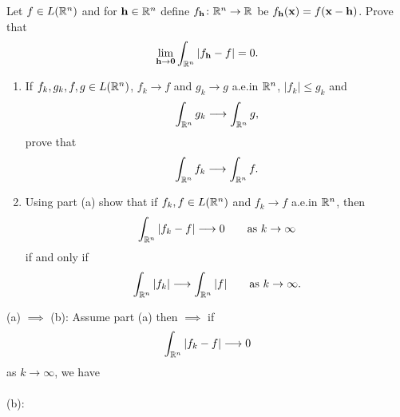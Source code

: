 \begin{problem}
Let $f\in L(\mathbb{R}^n)$ and for $\mathbf{h}\in\mathbb{R}^n$ define
$f_{\mathbf{h}}\colon\mathbb{R}^n\to\mathbb{R}$ be $f_{\mathbf{h}}(\mathbf{x})=
f(\mathbf{x}-\mathbf{h})$. Prove that
\[
\lim_{\mathbf{h}\to\mathbf{0}}\int_{\mathbb{R}^n}\left|f_{\mathbf{h}}-f\right|=0.
\]
\end{problem}
\begin{solution}
\end{solution}

\begin{problem}
\begin{enumerate}[label=(\alph*),noitemsep]
\item If $f_k,g_k,f,g\in L(\mathbb{R}^n)$, $f_k\to f$ and $g_k\to g$ a.e.\@ in
  $\mathbb{R}^n$, $|f_k|\leq g_k$ and
\[
\int_{\mathbb{R}^n}g_k\longrightarrow\int_{\mathbb{R}^n}g,
\]
prove that
\[
\int_{\mathbb{R}^n} f_k\longrightarrow\int_{\mathbb{R}^n}f.
\]
\item Using part (a) show that if $f_k,f\in L(\mathbb{R}^n)$ and $f_k\to f$
  a.e.\@ in $\mathbb{R}^n$, then
\[
\int_{\mathbb{R}^n}|f_k-f|\longrightarrow 0\qquad\text{as $k\to\infty$}
\]
if and only if
\[
\int_{\mathbb{R}^n}|f_k|\longrightarrow\int_{\mathbb{R}^n}|f|\qquad\text{as $k\to\infty$}.
\]
\end{enumerate}
\end{problem}
\begin{solution}
(a) $\implies$ (b): Assume part (a) then $\implies$ if
\begin{equation}
\label{eq:prep:2:12}
\int_{\mathbb{R}^n}|f_k-f|\longrightarrow 0
\end{equation}
as $k\to\infty$, we have
\\\\
(b):
\end{solution}

